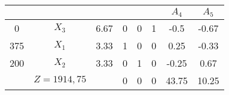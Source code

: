     \begin{tabular}{cccccccc}
    \hline
    \hline
            &         &         &         &         &         & $A_4$   & $A_5$ \bigstrut\\
    \hline
    0       & $X_3$   & 6.67    & 0       & 0       & 1       & -0.5    & -0.67 \bigstrut[t]\\
    375     & $X_1$   & 3.33    & 1       & 0       & 0       & 0.25    & -0.33 \\
    200     & $X_2$   & 3.33    & 0       & 1       & 0       & -0.25   & 0.67 \bigstrut[b]\\
    \hline
            & $Z=1914,75$ &         & 0       & 0       & 0       & 43.75   & 10.25 \bigstrut\\
    \hline
    \hline
    \end{tabular}%
